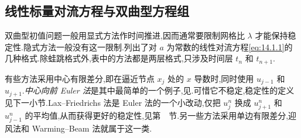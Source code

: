 \subsection{线性标量对流方程与双曲型方程组}\label{sec:14.2.1}

双曲型初值问题一般用显式方法作时间推进,因而通常要限制网格比 \(\lambda\) 才能保持稳定性.隐式方法一般没有这一限制.列出了对 \(a\) 为常数的线性对流方程\eqref{eq:14.1.1}的几种格式.除蛙跳格式外,表中的方法都是两层格式,只涉及时间层 \(t_n\) 和 \(t_{n+1}\).

有些方法采用中心有限差分,即在逼近节点 \(x_j\) 处的 \(x\) 导数时,同时使用 \(u_{j-1}\) 和 \(u_{j+1}\).\emph{中心向前 Euler 法}是其中最简单的一个例子,见.可惜它不稳定,稳定性的定义见下一小节.Lax--Friedrichs 法是 Euler 法的一个小改动,仅把 \(u_j^n\) 换成 \(u_{j+1}^n\) 和
\(u_{j-1}^n\) 的平均值,从而获得更好的稳定性,见第~~节.另一些方法采用单边有限差分,迎风法和 Warming--Beam 法就属于这一类.

